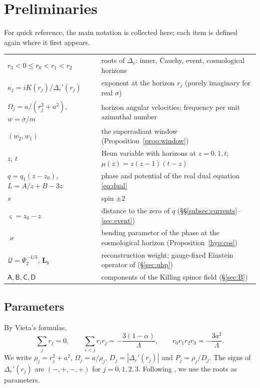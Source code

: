 \documentclass[11pt]{amsart}
\theoremstyle{definition}
\theoremstyle{remark}
\numberwithin{equation}{section}
\begin{document}
\section{Preliminaries}\label{sec:prelim}
For quick reference, the main notation is collected here; each item is defined again where it first appears.
\begin{center}\small
\renewcommand{\arraystretch}{1.15}
\begin{tabular}{p{}p{}}
$r_3<0\le r_0<r_1<r_2$ & roots of $\Delta_r$: inner, Cauchy, event, cosmological horizons\\
$\kappa_j=iK(r_j)/\Delta_r'(r_j)$ & exponent at the horizon $r_j$ (purely imaginary for real $\sigma$)\\
$\Omega_j=a/(r_j^2+a^2)$, $w=\sigma/m$ & horizon angular velocities; frequency per unit azimuthal number\\
$(w_2,w_1)$ & the superradiant window (Proposition~\ref{prop:window})\\
$z$, $t$ & Heun variable with horizons at $z=0,1,t$; $\mu(z)=z(z-1)(t-z)$\\
$q=q_1(z-z_0)$, $L=A/z+B-3z$ & phase and potential of the real dual equation \eqref{eq:dual}\\
$s$ & spin $\pm2$\\
$\varsigma=z_0-z$ & distance to the zero of $q$ (\S\S\ref{subsec:currents}--\ref{sec:event})\\
$\varkappa$ & bending parameter of the phase at the cosmological horizon (Proposition~\ref{hyp:cos})\\
$\mathcal Q=\Psi_2^{-4/3}$, $\mathbf L_b$ & reconstruction weight; gauge-fixed Einstein operator of \cite{HPV25} (\S\ref{sec:uhp})\\
$\mathsf A,\mathsf B,\mathsf C,\mathsf D$ & components of the Killing spinor field (\S\ref{sec:B})
\end{tabular}
\end{center}


\subsection{Parameters}
By Vieta's formulas,
\begin{equation}\label{eq:vieta}
\sum_j r_j=0,\qquad \sum_{i<j}r_ir_j=-\frac{3(1-\alpha)}{\Lambda},\qquad r_0r_1r_2r_3=-\frac{3a^2}{\Lambda}.
\end{equation}
We write $\rho_j=r_j^2+a^2$, $\Omega_j=a/\rho_j$, $D_j=|\Delta_r'(r_j)|$ and $P_j=\rho_j/D_j$. The signs of
$\Delta_r'(r_j)$ are $(-,+,-,+)$ for $j=0,1,2,3$. Following \cite[\S6, footnote~5]{Hin26}, we use the roots as
parameters.
\end{document}
